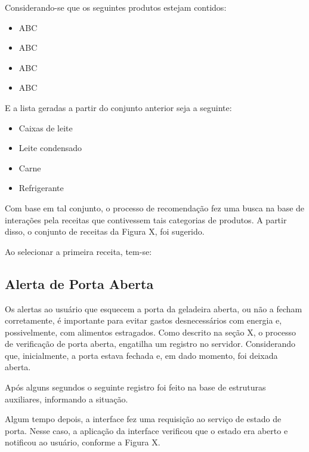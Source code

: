 Considerando-se que os seguintes produtos estejam contidos:

\begin{itemize} \parskip -3pt
    \item ABC
    \item ABC
    \item ABC
    \item ABC
\end{itemize}

E a lista geradas a partir do conjunto anterior seja a seguinte:

\begin{itemize} \parskip -3pt
    \item Caixas de leite
    \item Leite condensado
    \item Carne
    \item Refrigerante
\end{itemize}

Com base em tal conjunto, o processo de recomendação fez uma busca na base de interações pela receitas que contivessem tais categorias de produtos. A partir disso, o conjunto de receitas da Figura X, foi sugerido.


Ao selecionar a primeira receita, tem-se:


\subsection{Alerta de Porta Aberta}

Os alertas ao usuário que esquecem a porta da geladeira aberta, ou não a fecham corretamente, é importante para evitar gastos desnecessários com energia e, possivelmente, com alimentos estragados. Como descrito na seção X, o processo de verificação de porta aberta, engatilha um registro no servidor. Considerando que, inicialmente, a porta estava fechada e, em dado momento, foi deixada aberta.

Após alguns segundos o seguinte registro foi feito na base de estruturas auxiliares, informando a situação.


Algum tempo depois, a interface fez uma requisição ao serviço de estado de porta. Nesse caso, a aplicação da interface verificou que o estado era aberto e notificou ao usuário, conforme a Figura X.


